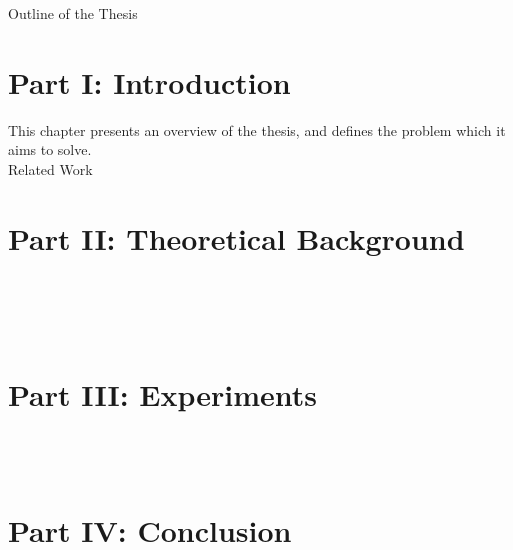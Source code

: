 \clearemptydoublepage

{}

\begin{center}
    \huge{Outline of the Thesis}
\end{center}

\section*{Part I: Introduction}

  \vspace{1mm}
\noindent  This chapter presents an overview of the thesis, and defines the problem which it aims to solve. \\

  \vspace{1mm}
\noindent Related Work \\

\section*{Part II: Theoretical Background}

  \vspace{1mm} \\

  \vspace{1mm} \\

  \vspace{1mm} \\

\section*{Part III: Experiments}
  \vspace{1mm} \\

  \vspace{1mm} \\

\section*{Part IV: Conclusion}
  \vspace{1mm} \\
